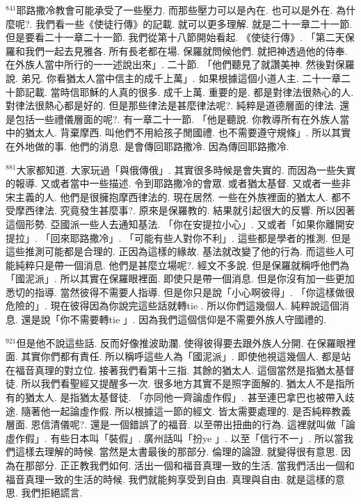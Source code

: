 \documentclass{book}
\begin{document}
$^{841}$耶路撒冷教會可能承受了一些壓力.
而那些壓力可以是內在.
也可以是外在.
為什麼呢?.
我們看一些《使徒行傳》的記載.
就可以更多理解.
就是二十一章二十一節.
但是要看二十一章二十一節.
我們從第十八節開始看起.
《使徒行傳》.
「第二天保羅和我們一起去見雅各.
所有長老都在場.
保羅就問候他們.
就把神透過他的侍奉.
在外族人當中所行的一一述說出來」.
二十節.
「他們聽見了就讚美神.
然後對保羅說.
弟兄.
你看猶太人當中信主的成千上萬」.
如果根據這個小道人主.
二十一章二十節記載.
當時信耶穌的人真的很多.
成千上萬.
重要的是.
都是對律法很熱心的人.
對律法很熱心都是好的.
但是那些律法是甚麼律法呢?.
純粹是道德層面的律法.
還是包括一些禮儀層面的呢?.
有一章二十一節.
「他是聽說.
你教導所有在外族人當中的猶太人.
背棄摩西.
叫他們不用給孩子閒國禮.
也不需要遵守規條」.
所以其實在外地做的事.
他們的消息.
是會傳回耶路撒冷.
因為傳回耶路撒冷.

$^{881}$大家都知道.
大家玩過「與俄傳俄」.
其實很多時候是會失實的.
而因為一些失實的報導.
又或者當中一些描述.
令到耶路撒冷的會眾.
或者猶太基督.
又或者一些非宋主義的人.
他們是很擁抱摩西律法的.
現在居然.
一些在外族裡面的猶太人.
都不受摩西律法.
究竟發生甚麼事?.
原來是保羅教的.
結果就引起很大的反響.
所以因著這個形勢.
亞國派一些人去通知基法.
「你在安提拉小心」.
又或者「如果你離開安提拉」.
「回來耶路撒冷」.
「可能有些人對你不利」.
這些都是學者的推測.
但是這些推測可能都是合理的.
正因為這樣的緣故.
基法就改變了他的行為.
而這些人可能純粹只是帶一個消息.
他們是甚麼立場呢?.
經文不多說.
但是保羅就稱呼他們為「國泥派」.
所以其實在保羅眼裡面.
即使只是帶一個消息.
但是你沒有加一些更加悉切的指導.
當然彼得不需要人指導.
但是你只是說「小心啊彼得」.
「你這樣做很危險的」.
現在彼得因為你說完這些話就轉tie .
所以你們這幾個人.
純粹說這個消息.
還是說「你不需要轉tie 」.
因為我們這個信仰是不需要外族人守國禮的.

$^{921}$但是他不說這些話.
反而好像推波助瀾.
使得彼得要去跟外族人分開.
在保羅眼裡面.
其實你們都有責任.
所以稱呼這些人為「國泥派」.
即使他視這幾個人.
都是站在福音真理的對立位.
接著我們看第十三指.
其餘的猶太人.
這個當然是指猶太基督徒.
所以我們看聖經又提醒多一次.
很多地方其實不是照字面解的.
猶太人不是指所有的猶太人.
是指猶太基督徒.
「亦同他一齊論虛作假」.
甚至連巴拿巴也被帶入歧途.
隨著他一起論虛作假.
所以根據這一節的經文.
皆太需要處理的.
是否純粹教義層面.
恩信清儀呢?.
還是一個錯誤了的福音.
以至帶出扭曲的行為.
這裡就叫做「論虛作假」.
有些日本叫「裝假」.
廣州話叫「扮ye 」.
以至「信行不一」.
所以當我們這樣去理解的時候.
當然是太書最後的那部分.
倫理的論證.
就變得很有意思.
因為在那部分.
正正教我們如何.
活出一個和福音真理一致的生活.
當我們活出一個和福音真理一致的生活的時候.
我們就能夠享受到自由.
真理與自由.
就是這樣的意思.
我們拒絕謊言.
\end{document}
